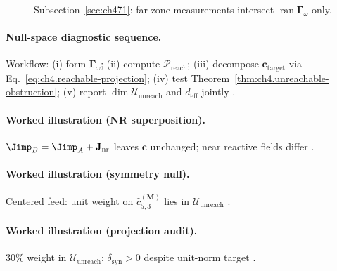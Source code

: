 \begin{figure}[t]
\centering
{}
\caption{Subsection~\ref{sec:ch471}: far-zone measurements intersect \(\operatorname{ran}\boldsymbol{\Gamma}_\omega\) only.}
\label{fig:ch4.measurement-intersection}
\end{figure}

\paragraph{Null-space diagnostic sequence.}
Workflow: (i) form \(\boldsymbol{\Gamma}_\omega\); (ii) compute \(\mathcal{P}_{\mathrm{reach}}\); (iii) decompose \(\mathbf{c}_{\mathrm{target}}\) via
Eq.~\eqref{eq:ch4.reachable-projection}; (iv) test Theorem~\ref{thm:ch4.unreachable-obstruction}; (v) report \(\dim\mathcal{U}_{\mathrm{unreach}}\) and
\(d_{\mathrm{eff}}\) jointly \cite{harrington2001,stratton1941,devaney2004,hansen1988}.

\paragraph{Worked illustration (NR superposition).}
\(\Jimp_{B}=\Jimp_{A}+\mathbf{J}_{\mathrm{nr}}\) leaves \(\mathbf{c}\) unchanged; near reactive fields differ \cite{stratton1941,harrington2001,devaney2004}.

\paragraph{Worked illustration (symmetry null).}
Centered feed: unit weight on \(\widehat{c}_{5,3}^{(\mathbf{M})}\) lies in \(\mathcal{U}_{\mathrm{unreach}}\) \cite{hansen1988,jackson1999,stratton1941}.

\paragraph{Worked illustration (projection audit).}
\(30\%\) weight in \(\mathcal{U}_{\mathrm{unreach}}\): \(\delta_{\mathrm{syn}}>0\) despite unit-norm target \cite{hansen1988,harrington2001,stratton1941}.

